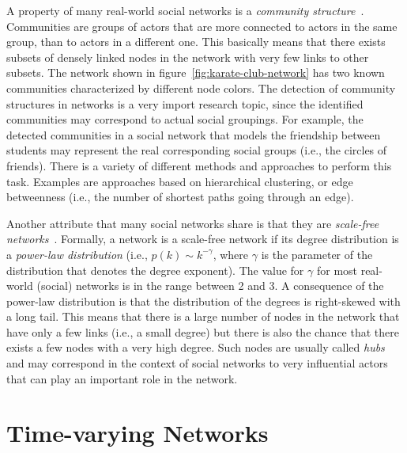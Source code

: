 A property of many real-world social networks is a \emph{community structure}~\cite{Girvan2002}.
Communities are groups of actors that are more connected to actors in the same group, than to actors in a different one.
This basically means that there exists subsets of densely linked nodes in the network with very few links to other subsets.
The network shown in figure~\ref{fig:karate-club-network} has two known communities characterized by different node colors.
The detection of community structures in networks is a very import research topic, since the identified communities may correspond to actual social groupings.
For example, the detected communities in a social network that models the friendship between students may represent the real corresponding social groups (i.e., the circles of friends).
There is a variety of different methods and approaches to perform this task.
Examples are approaches based on hierarchical clustering, or edge betweenness (i.e., the number of shortest paths going through an edge).

Another attribute that many social networks share is that they are \emph{scale-free networks}~\cite{Barabasi2016}.
Formally, a network is a scale-free network if its degree distribution is a \emph{power-law distribution} (i.e., \(p(k) \sim k^{-\gamma}\), where \(\gamma\) is the parameter of the distribution that denotes the degree exponent).
The value for \(\gamma\) for most real-world (social) networks is in the range between 2 and 3.
A consequence of the power-law distribution is that the distribution of the degrees is right-skewed with a long tail.
This means that there is a large number of nodes in the network that have only a few links (i.e., a small degree) but there is also the chance that there exists a few nodes with a very high degree.
Such nodes are usually called \emph{hubs} and may correspond in the context of social networks to very influential actors that can play an important role in the network.




\section{Time-varying Networks}

